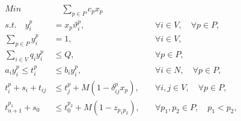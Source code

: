 \begin{spreadlines}{14pt} %
    \allowdisplaybreaks
    \begin{align}
        Min                                                                               & \quad \sum_{p \in P} c_p x_p            & \quad
        \label{eq1}                                                                                                                                                                    \\
        s.t. \quad y^p_i                                                                  & = x_p \vartheta^p_i,                    & \quad \forall i \in V, \quad \forall p \in P,
        \label{eq2}                                                                                                                                                                    \\
        \sum_{p \in P} y^p_i                                                              & = 1,                                    & \quad \forall i \in V,
        \label{eq3}                                                                                                                                                                    \\
        \sum_{i \in V} q_i y^p_i                                                          & \leq Q,                                 & \quad \forall p \in P,
        \label{eq4}                                                                                                                                                                    \\
        a_i y^p_i \leq t^p_i                                                              & \leq b_i y^p_i,                         & \quad \forall i \in N, \quad \forall p \in P,
        \label{eq5}                                                                                                                                                                    \\
        t^p_i + s_i + t_{ij}                                                              & \leq t^p_j + M(1 - \delta^p_{ij} x_p),  & \quad \forall i, j \in V, \quad \forall p \in P,
        \label{eq6}                                                                                                                                                                    \\
        t^{p_1}_{n + 1} + s_0                                                             & \leq t^{p_2}_0 + M(1 - z_{{p_1}{p_2}}), & \quad \forall p_1, p_2 \in P, \quad p_1 < p_2,

\end{align}
\end{spreadlines}
